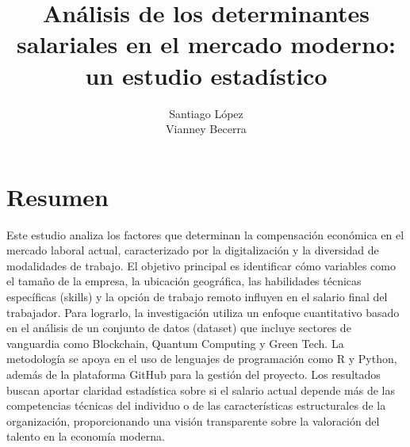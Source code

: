 \documentclass[oneside,11pt]{Latex/Classes/PhDthesisPSnPDF}
\title{Análisis de los determinantes salariales en el mercado moderno:
un estudio estadístico}
\author{Santiago López \\ Vianney Becerra}
\begin{document}
\maketitle

\frontmatter


\setcounter{secnumdepth}{3}
\setcounter{tocdepth}{3}

\tableofcontents



\cleardoublepage

  \cleardoublepage       %
  \chapter*{Resumen}     %
  
  Este estudio analiza los factores que determinan la compensación
económica en el mercado laboral actual, caracterizado por la
digitalización y la diversidad de modalidades de trabajo. El objetivo
principal es identificar cómo variables como el tamaño de la empresa, la
ubicación geográfica, las habilidades técnicas específicas (skills) y la
opción de trabajo remoto influyen en el salario final del trabajador.
Para lograrlo, la investigación utiliza un enfoque cuantitativo basado
en el análisis de un conjunto de datos (dataset) que incluye sectores de
vanguardia como Blockchain, Quantum Computing y Green Tech. La
metodología se apoya en el uso de lenguajes de programación como R y
Python, además de la plataforma GitHub para la gestión del proyecto. Los
resultados buscan aportar claridad estadística sobre si el salario
actual depende más de las competencias técnicas del individuo o de las
características estructurales de la organización, proporcionando una
visión transparente sobre la valoración del talento en la economía
moderna.             %
  
  \cleardoublepage
\end{document}
